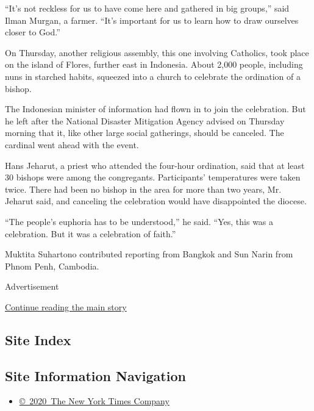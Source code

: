 ``It's not reckless for us to have come here and gathered in big
groups,'' said Ilman Murgan, a farmer. ``It's important for us to learn
how to draw ourselves closer to God.''

On Thursday, another religious assembly, this one involving Catholics,
took place on the island of Flores, further east in Indonesia. About
2,000 people, including nuns in starched habits, squeezed into a church
to celebrate the ordination of a bishop.

The Indonesian minister of information had flown in to join the
celebration. But he left after the National Disaster Mitigation Agency
advised on Thursday morning that it, like other large social gatherings,
should be canceled. The cardinal went ahead with the event.

Hans Jeharut, a priest who attended the four-hour ordination, said that
at least 30 bishops were among the congregants. Participants'
temperatures were taken twice. There had been no bishop in the area for
more than two years, Mr. Jeharut said, and canceling the celebration
would have disappointed the diocese.

``The people's euphoria has to be understood,'' he said. ``Yes, this was
a celebration. But it was a celebration of faith.''

Muktita Suhartono contributed reporting from Bangkok and Sun Narin from
Phnom Penh, Cambodia.

Advertisement

\protect\hyperlink{after-bottom}{Continue reading the main story}

\hypertarget{site-index}{%
\subsection{Site Index}\label{site-index}}

\hypertarget{site-information-navigation}{%
\subsection{Site Information
Navigation}\label{site-information-navigation}}

\begin{itemize}
\tightlist
\item
  \href{https://help.nytimes3xbfgragh.onion/hc/en-us/articles/115014792127-Copyright-notice}{©~2020~The
  New York Times Company}
\end{itemize}

